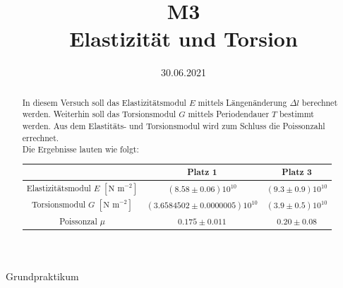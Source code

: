 \documentclass[bibliography=totocnumbered]{scrartcl}
\title{M3 \\ Elastizität und Torsion}
\date{30.06.2021}
\begin{document}
	\begin{titlepage}
		\begin{center}
			{\huge{Grundpraktikum}}\\\vspace*{15mm}
			{\huge{\textbf{\thetitle}}}\\\vspace*{20mm}
			{\theauthor}\\\vspace*{10mm}
			{\thedate}\\\vspace*{20mm}
			
			\vspace{1.5cm}
			\begin{abstract}
				In diesem Versuch soll das Elastizitätsmodul $ E $ mittels Längenänderung $ \Delta l $ berechnet werden. Weiterhin soll das Torsionsmodul $ G $ mittels Periodendauer $ T $ bestimmt werden. Aus dem Elastitäts- und Torsionsmodul wird zum Schluss die Poissonzahl errechnet. \\
				Die Ergebnisse lauten wie folgt:
				
			\begin{table}[ht!]
				\centering	
				\begin{tabular}{|c|c|c|}
					\hline
					 &                      Platz 1 &          Platz 3 \\
					\hline
					Elastizitätsmodul $ E $ $ \left[\text{N m}^{-2} \right]$ &            $ (8.58\pm0.06)10^{10}  $&  $ (9.3\pm 0.9)10^{10} $\\
					Torsionsmodul $ G $ $ \left[\text{N m}^{-2} \right]$ &  $ (3.6584502\pm0.0000005)10^{10} $&  $ (3.9\pm0.5)10^{10} $ \\
					Poissonzal $ \mu $                             &                $ 0.175\pm 0.011 $ &      $ 0.20\pm0.08 $ \\
					\hline
				\end{tabular}
				
			\end{table}
				
			\end{abstract}
			
			
		\end{center}
	\end{titlepage}
	\makeatother
	\restoregeometry
	\newpage
	
	\tableofcontents
	
	
	\listoffigures 
	\listoftables
	\newpage
	
\end{document}
